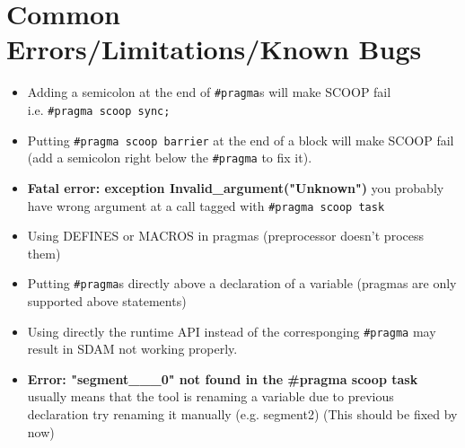 \documentclass[
a4paper,
12pt,
]{article}
\begin{document}
\section{Common Errors/Limitations/Known Bugs}

\begin{itemize}
\item Adding a semicolon at the end of \verb!#pragma!s will make SCOOP fail\\
  i.e. \verb!#pragma scoop sync;!
\item Putting \verb!#pragma scoop barrier! at the end of a block will make SCOOP fail\\
  (add a semicolon right below the \verb!#pragma! to fix it).
\item \textbf{{Fatal error: exception Invalid\_argument("Unknown")}}
  you probably have wrong argument at a call tagged with
  \verb!#pragma scoop task!
\item Using DEFINES or MACROS in pragmas (preprocessor doesn't process
  them)
\item Putting \verb!#pragma!s directly above a declaration of a
  variable (pragmas are only supported above statements)
\item Using directly the runtime API instead of the corresponging
  \verb!#pragma! may result in SDAM not working properly.
\item \textbf{Error: "segment\_\_\_0" not found in the \#pragma scoop
    task} usually means that the tool is renaming a variable due to
  previous declaration try renaming it manually (e.g. segment2) (This
  should be fixed by now)
\end{itemize}
\end{document}
